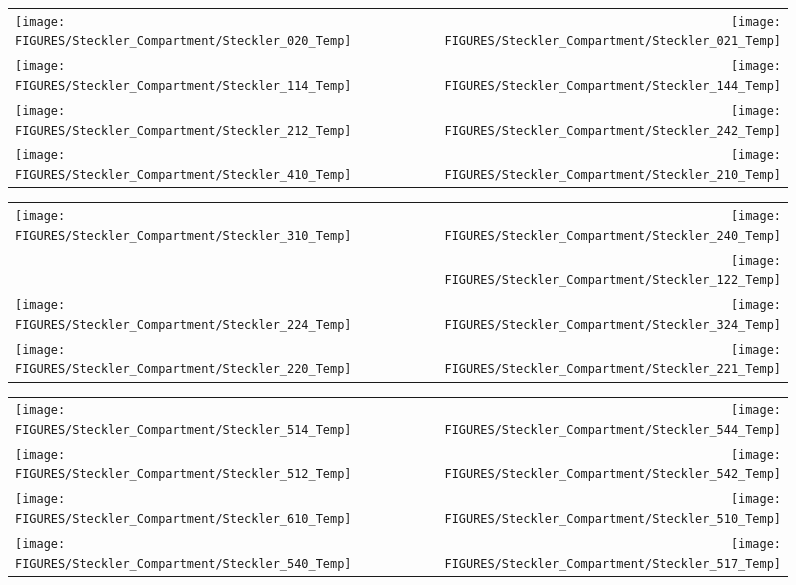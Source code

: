 \begin{figure}[p]
\begin{tabular*}{\textwidth}{l@{\extracolsep{\fill}}r}
\texttt{[image: FIGURES/Steckler\_Compartment/Steckler\_020\_Temp]} &
\texttt{[image: FIGURES/Steckler\_Compartment/Steckler\_021\_Temp]} \\
\texttt{[image: FIGURES/Steckler\_Compartment/Steckler\_114\_Temp]} &
\texttt{[image: FIGURES/Steckler\_Compartment/Steckler\_144\_Temp]} \\
\texttt{[image: FIGURES/Steckler\_Compartment/Steckler\_212\_Temp]} &
\texttt{[image: FIGURES/Steckler\_Compartment/Steckler\_242\_Temp]} \\
\texttt{[image: FIGURES/Steckler\_Compartment/Steckler\_410\_Temp]} &
\texttt{[image: FIGURES/Steckler\_Compartment/Steckler\_210\_Temp]}
\end{tabular*}
\label{Steckler_Temp_3}
\end{figure}

\begin{figure}[p]
\begin{tabular*}{\textwidth}{l@{\extracolsep{\fill}}r}
\texttt{[image: FIGURES/Steckler\_Compartment/Steckler\_310\_Temp]} &
\texttt{[image: FIGURES/Steckler\_Compartment/Steckler\_240\_Temp]} \\
 & %
\texttt{[image: FIGURES/Steckler\_Compartment/Steckler\_122\_Temp]} \\
\texttt{[image: FIGURES/Steckler\_Compartment/Steckler\_224\_Temp]} &
\texttt{[image: FIGURES/Steckler\_Compartment/Steckler\_324\_Temp]} \\
\texttt{[image: FIGURES/Steckler\_Compartment/Steckler\_220\_Temp]} &
\texttt{[image: FIGURES/Steckler\_Compartment/Steckler\_221\_Temp]}
\end{tabular*}
\label{Steckler_Temp_4}
\end{figure}

\begin{figure}[p]
\begin{tabular*}{\textwidth}{l@{\extracolsep{\fill}}r}
\texttt{[image: FIGURES/Steckler\_Compartment/Steckler\_514\_Temp]} &
\texttt{[image: FIGURES/Steckler\_Compartment/Steckler\_544\_Temp]} \\
\texttt{[image: FIGURES/Steckler\_Compartment/Steckler\_512\_Temp]} &
\texttt{[image: FIGURES/Steckler\_Compartment/Steckler\_542\_Temp]} \\
\texttt{[image: FIGURES/Steckler\_Compartment/Steckler\_610\_Temp]} &
\texttt{[image: FIGURES/Steckler\_Compartment/Steckler\_510\_Temp]} \\
\texttt{[image: FIGURES/Steckler\_Compartment/Steckler\_540\_Temp]} &
\texttt{[image: FIGURES/Steckler\_Compartment/Steckler\_517\_Temp]}
\end{tabular*}
\label{Steckler_Temp_5}
\end{figure}

